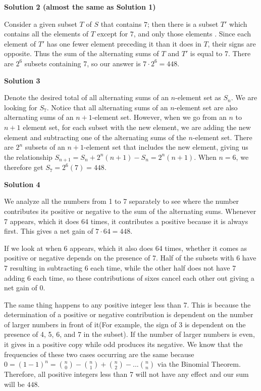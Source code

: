 \begin{enumerate}
\textbf{Solution 2 (almost the same as Solution 1)}

Consider a given subset $T$ of $S$ that contains $7$; then there is a subset $T'$ which contains all the elements of $T$ except for $7$, and only those elements . Since each element of $T'$ has one fewer element preceding it than it does in $T$, their signs are opposite. Thus the sum of the alternating sums of $T$ and $T'$ is equal to 7. There are $2^6$ subsets containing 7, so our answer is $7 \cdot 2^6 = \boxed{448}$.

 



\textbf{Solution 3}

Denote the desired total of all alternating sums of an $n$-element set as $S_n$. We are looking for $S_7$. Notice that all alternating sums of an $n$-element set are also alternating sums of an $n+1$-element set. However, when we go from an $n$ to $n+1$ element set, for each subset with the new element, we are adding the new element and subtracting one of the alternating sums of the $n$-element set. There are $2^n$ subsets of an $n+1$-element set that includes the new element, giving us the relationship $S_{n+1} = S_n + 2^n(n+1) - S_n = 2^n(n+1)$. When $n = 6$, we therefore get $S_ 7 = 2^6(7) = \boxed{448}$.

 



\textbf{Solution 4}

We analyze all the numbers from 1 to 7 separately to see where the number contributes its positive or negative to the sum of the alternating sums. Whenever 7 appears, which it does 64 times, it contributes a positive because it is always first. This gives a net gain of $7 \cdot 64=448$.

 If we look at when 6 appears, which it also does 64 times, whether it comes as positive or negative depends on the presence of 7. Half of the subsets with 6 have 7 resulting in subtracting 6 each time, while the other half does not have 7 adding 6 each time, so these contributions of sixes cancel each other out giving a net gain of 0.

 The same thing happens to any positive integer less than 7. This is because the determination of a positive or negative contribution is dependent on the number of larger numbers in front of it(For example, the sign of 3 is dependent on the presence of 4, 5, 6, and 7 in the subset). If the number of larger numbers is even, it gives in a positive copy while odd produces its negative. We know that the frequencies of these two cases occurring are the same because $0=(1-1)^{n}=\binom{n}{0}-\binom{n}{1}+\binom{n}{2}-...\binom{n}{n}$ via the Binomial Theorem. Therefore, all positive integers less than 7 will not have any effect and our sum will be $\boxed{448}$.


\end{enumerate}
